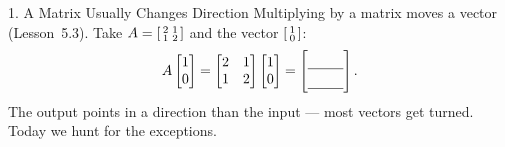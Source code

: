 \documentclass[10pt]{article}
\begin{document}
\begin{notesbox}{1. A Matrix Usually Changes Direction}
Multiplying by a matrix moves a vector (Lesson~5.3). Take
$A=\begin{bsmallmatrix} 2 & 1\\ 1 & 2 \end{bsmallmatrix}$ and the vector
$\begin{bsmallmatrix} 1\\ 0 \end{bsmallmatrix}$:
\[
  A\begin{bmatrix} 1\\ 0 \end{bmatrix}
  = \begin{bmatrix} 2 & 1\\ 1 & 2 \end{bmatrix}\begin{bmatrix} 1\\ 0 \end{bmatrix}
  = \begin{bmatrix}\rule{0pt}{1.1em}\blank{0.9cm}\\[2pt]\blank{0.9cm}\end{bmatrix}.
\]
The output points in a \blank{2.4cm} direction than the input --- most vectors get turned. Today we
hunt for the exceptions.
\end{notesbox}
\end{document}
